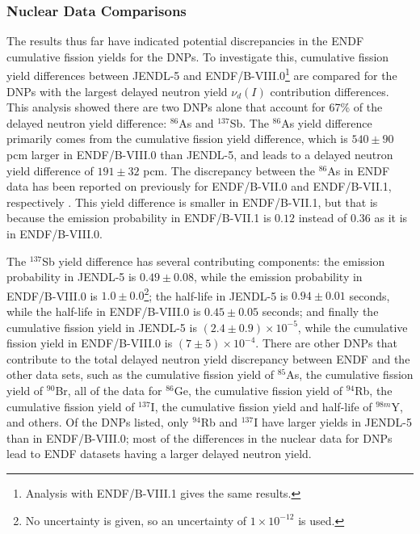 \subsubsection{Nuclear Data Comparisons}

The results thus far have indicated potential discrepancies in the ENDF cumulative fission yields for the \glspl{DNP}.
To investigate this, cumulative fission yield differences between JENDL-5 and ENDF/B-VIII.0\footnote{Analysis with ENDF/B-VIII.1 gives the same results.} are compared for the \glspl{DNP} with the largest delayed neutron yield $\nu_d(I)$ contribution differences.
This analysis showed there are two \glspl{DNP} alone that account for 67\% of the delayed neutron yield difference: $^{86}$As and $^{137}$Sb.
The $^{86}$As yield difference primarily comes from the cumulative fission yield difference, which is $540 \pm 90$ pcm larger in ENDF/B-VIII.0 than JENDL-5, and leads to a delayed neutron yield difference of $191 \pm 32$ pcm.
The discrepancy between the $^{86}$As in ENDF data has been reported on previously for ENDF/B-VII.0 and ENDF/B-VII.1, respectively \cite{foligno_new_2019, mills2014calculation}.
This yield difference is smaller in ENDF/B-VII.1, but that is because the emission probability in ENDF/B-VII.1 is $0.12$ instead of $0.36$ as it is in ENDF/B-VIII.0.

The $^{137}$Sb yield difference has several contributing components: the emission probability in JENDL-5 is $0.49 \pm 0.08$, while the emission probability in ENDF/B-VIII.0 is $1.0 \pm 0.0$\footnote{No uncertainty is given, so an uncertainty of $1 \times 10^{-12}$ is used.}; the half-life in JENDL-5 is $0.94 \pm 0.01$ seconds, while the half-life in ENDF/B-VIII.0 is $0.45 \pm 0.05$ seconds; and finally the cumulative fission yield in JENDL-5 is $(2.4 \pm 0.9) \times 10^{-5}$, while the cumulative fission yield in ENDF/B-VIII.0 is $(7 \pm 5)\times 10^{-4}$.
There are other \glspl{DNP} that contribute to the total delayed neutron yield discrepancy between ENDF and the other data sets, such as the cumulative fission yield of $^{85}$As, the cumulative fission yield of $^{90}$Br, all of the data for $^{86}$Ge, the cumulative fission yield of $^{94}$Rb, the cumulative fission yield of $^{137}$I, the cumulative fission yield and half-life of $^{98m}$Y, and others.
Of the \glspl{DNP} listed, only $^{94}$Rb and $^{137}$I have larger yields in JENDL-5 than in ENDF/B-VIII.0; most of the differences in the nuclear data for \glspl{DNP} lead to ENDF datasets having a larger delayed neutron yield. 


